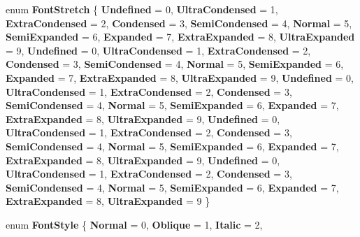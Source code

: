 \begin{DoxyCompactItemize}
enum {\bfseries Font\+Stretch} \{ \newline
{\bfseries Undefined} = 0, 
{\bfseries Ultra\+Condensed} = 1, 
{\bfseries Extra\+Condensed} = 2, 
{\bfseries Condensed} = 3, 
\newline
{\bfseries Semi\+Condensed} = 4, 
{\bfseries Normal} = 5, 
{\bfseries Semi\+Expanded} = 6, 
{\bfseries Expanded} = 7, 
\newline
{\bfseries Extra\+Expanded} = 8, 
{\bfseries Ultra\+Expanded} = 9, 
{\bfseries Undefined} = 0, 
{\bfseries Ultra\+Condensed} = 1, 
\newline
{\bfseries Extra\+Condensed} = 2, 
{\bfseries Condensed} = 3, 
{\bfseries Semi\+Condensed} = 4, 
{\bfseries Normal} = 5, 
\newline
{\bfseries Semi\+Expanded} = 6, 
{\bfseries Expanded} = 7, 
{\bfseries Extra\+Expanded} = 8, 
{\bfseries Ultra\+Expanded} = 9, 
\newline
{\bfseries Undefined} = 0, 
{\bfseries Ultra\+Condensed} = 1, 
{\bfseries Extra\+Condensed} = 2, 
{\bfseries Condensed} = 3, 
\newline
{\bfseries Semi\+Condensed} = 4, 
{\bfseries Normal} = 5, 
{\bfseries Semi\+Expanded} = 6, 
{\bfseries Expanded} = 7, 
\newline
{\bfseries Extra\+Expanded} = 8, 
{\bfseries Ultra\+Expanded} = 9, 
{\bfseries Undefined} = 0, 
{\bfseries Ultra\+Condensed} = 1, 
\newline
{\bfseries Extra\+Condensed} = 2, 
{\bfseries Condensed} = 3, 
{\bfseries Semi\+Condensed} = 4, 
{\bfseries Normal} = 5, 
\newline
{\bfseries Semi\+Expanded} = 6, 
{\bfseries Expanded} = 7, 
{\bfseries Extra\+Expanded} = 8, 
{\bfseries Ultra\+Expanded} = 9, 
\newline
{\bfseries Undefined} = 0, 
{\bfseries Ultra\+Condensed} = 1, 
{\bfseries Extra\+Condensed} = 2, 
{\bfseries Condensed} = 3, 
\newline
{\bfseries Semi\+Condensed} = 4, 
{\bfseries Normal} = 5, 
{\bfseries Semi\+Expanded} = 6, 
{\bfseries Expanded} = 7, 
\newline
{\bfseries Extra\+Expanded} = 8, 
{\bfseries Ultra\+Expanded} = 9
 \}
\item 
\mbox{\label{namespace_windows_1_1_u_i_1_1_text_a60a89aee1a9831c91a4aabca7103b5e8}} 
enum {\bfseries Font\+Style} \{ \newline
{\bfseries Normal} = 0, 
{\bfseries Oblique} = 1, 
{\bfseries Italic} = 2, 

\end{DoxyCompactItemize}
